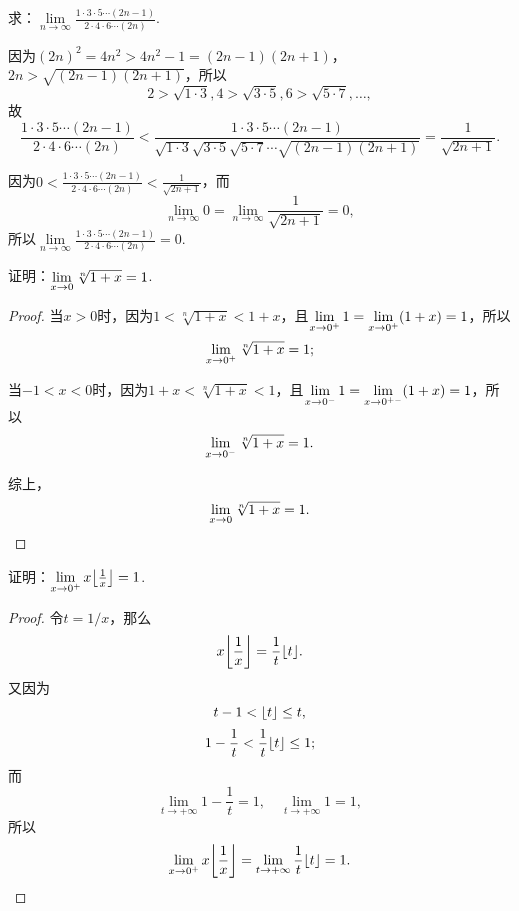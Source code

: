 \begin{example}
求：\(\lim\limits_{n\to\infty}\frac{1 \cdot 3 \cdot 5 \dotsm (2n-1)}{2 \cdot 4 \cdot 6 \dotsm (2n)}\).
\begin{solution}
因为\((2n)^2 = 4n^2 > 4n^2-1 = (2n-1)(2n+1)\)，\(2n > \sqrt{(2n-1)(2n+1)}\)，所以\[
2 > \sqrt{1 \cdot 3},
4 > \sqrt{3 \cdot 5},
6 > \sqrt{5 \cdot 7},
\dotsc,
\]故\[
\frac{1 \cdot 3 \cdot 5 \dotsm (2n-1)}{2 \cdot 4 \cdot 6 \dotsm (2n)}
< \frac{1 \cdot 3 \cdot 5 \dotsm (2n-1)}{\sqrt{1 \cdot 3} \sqrt{3 \cdot 5} \sqrt{5 \cdot 7} \dotsm \sqrt{(2n-1)(2n+1)}}
= \frac{1}{\sqrt{2n+1}}.
\]

因为\(0 < \frac{1 \cdot 3 \cdot 5 \dotsm (2n-1)}{2 \cdot 4 \cdot 6 \dotsm (2n)} < \frac{1}{\sqrt{2n+1}}\)，而\[
\lim\limits_{n\to\infty}0 = \lim\limits_{n\to\infty}\frac{1}{\sqrt{2n+1}} = 0,
\]所以\(\lim\limits_{n\to\infty}\frac{1 \cdot 3 \cdot 5 \dotsm (2n-1)}{2 \cdot 4 \cdot 6 \dotsm (2n)} = 0\).
\end{solution}
\end{example}

\begin{example}
\renewcommand\l[1][]{\lim\limits_{x\to0\ifx\relax#1\relax\else^{#1}\fi}}
证明：\(\l \sqrt[n]{1+x} = 1\).
\begin{proof}
当\(x > 0\)时，因为\(1 < \sqrt[n]{1+x} < 1+x\)，且\(\l[+] 1 = \l[+](1+x) = 1\)，所以\[
\l[+] \sqrt[n]{1+x} = 1;
\]

当\(-1 < x < 0\)时，因为\(1+x < \sqrt[n]{1+x} < 1\)，且\(\l[-] 1 = \l[+-](1+x) = 1\)，所以\[
\l[-] \sqrt[n]{1+x} = 1.
\]

综上，\[
\l \sqrt[n]{1+x} = 1.
\qedhere
\]
\end{proof}
\end{example}

\begin{example}
证明：\(\lim\limits_{x\to0^+} x \floor*{\frac{1}{x}} = 1\).
\begin{proof}
令\(t=1/x\)，那么\[
x \floor*{\frac{1}{x}} = \frac{1}{t} \floor{t}.
\]又因为\[
t - 1 < \lfloor t\rfloor \leq t,
\]\[
1 - \frac{1}{t} < \frac{1}{t} \lfloor t\rfloor \leq 1;
\]而\[
\lim\limits_{t\to+\infty} 1 - \frac{1}{t} = 1,
\quad
\lim\limits_{t\to+\infty} 1 = 1,
\]所以\[
\lim\limits_{x\to0^+} x \floor*{\frac{1}{x}} = \lim\limits_{t\to+\infty} \frac{1}{t} \floor{t} = 1.
\qedhere
\]
\end{proof}
\end{example}

